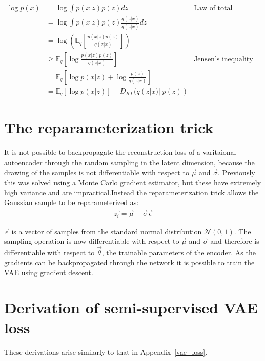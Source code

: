 \begin{align*}
  \log p(x) & = \log \int p(x|z)p(z) dz &\text{Law of total probability}\\
  & = \log \int p(x|z)p(z) \frac{q(z|x)}{q(z|x)} dz\\
  & = \log\left(\mathbb{E}_q \left[\frac{p(x|z)p(z)}{q(z|x)}\right]\right) \\
  & \geq \mathbb{E}_q \left[\log\frac{p(x|z)p(z)}{q(z|x)}\right] &\text{Jensen's inequality}\\
  & = \mathbb{E}_q \left[\log p(x|z) + \log\frac{p(z)}{q(z|x)}\right] \\
  & = \mathbb{E}_q [\log p(x|z)] - D_{KL}(q(z|x)||p(z))
\end{align*}

\chapter{The reparameterization trick} \label{reparam}

It is not possible to backpropagate the reconstruction loss of a varitaional autoencoder through the random sampling in the latent dimension, because the drawing of
the samples is not differentiable with respect to $\vec{\mu}$ and $\vec{\sigma}$. Previously this was solved using a Monte Carlo gradient estimator, but these have 
extremely high variance and are impractical.Instead the reparameterization trick allows the Gaussian sample to be reparameterized as:
\begin{align}
  \vec{z_{i}} = \vec{\mu} + \vec{\sigma}\vec{\epsilon}
\end{align}

$\vec{\epsilon}$ is a vector of samples from the standard normal distribution $\mathcal{N}(0, 1)$. The sampling operation is now differentiable
with respect to $\vec{\mu}$ and $\vec{\sigma}$ and therefore is differentiable with respect to $\vec{\theta}$, the trainable parameters of the encoder. As the
gradients can be backpropagated through the network it is possible to train the VAE using gradient descent.

\chapter{Derivation of semi-supervised VAE loss} \label{ssvae_loss}

These derivations arise similarly to that in Appendix~\ref{vae_loss}.

